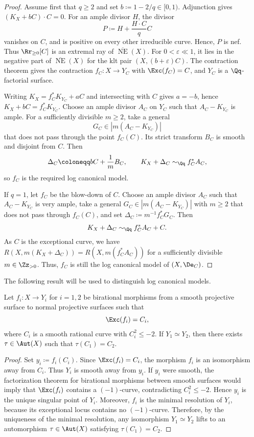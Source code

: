 \documentclass[12pt]{amsart}
\newcommand{\NE}{\overline{\operatorname{NE}}}
\begin{document}
\begin{proof}
Assume first that $q\geq2$ and set $b\coloneqq1-2/q\in[0,1)$. Adjunction gives $(K_X+bC)\cdot C=0$. For an ample divisor $H$, the divisor
\[
 P\coloneqq H+\frac{H\cdot C}{q}C
\]
vanishes on $C$, and is positive on every other irreducible curve. Hence, $P$ is nef. Thus $\Rr_{\geq0}[C]$ is an extremal ray of ${\NE}(X)$. For $0<\varepsilon\ll1$, it lies in the negative part of ${\NE}(X)$ for the klt pair $(X,(b+\varepsilon)C)$. The contraction theorem gives the contraction $f_C\colon X\to Y_C$ with $\Exc(f_C)=C$, and $Y_C$ is a $\Qq$-factorial surface. 

Writing $K_X=f_C^*K_{Y_C}+aC$ and intersecting with $C$ gives $a=-b$, hence $K_X+bC=f_C^*K_{Y_C}$. Choose an ample divisor $A_C$ on $Y_C$ such that $A_C-K_{Y_C}$ is ample. For a sufficiently divisible $m\geq2$, take a general
\[
 G_C\in|m(A_C-K_{Y_C})|
\]
that does not pass through the point $f_C(C)$. Its strict transform $B_C$ is smooth and disjoint from $C$. Then
\[
 \Delta_C\coloneqq bC+\frac1mB_C,
 \qquad K_X+\Delta_C\sim_{\Qq}f_C^*A_C,
\]
so $f_C$ is the required log canonical model.

If $q=1$, let $f_C$ be the blow-down of $C$. Choose an ample divisor $A_C$ such that $A_C-K_{Y_C}$ is very ample, take a general $G_C\in|m(A_C-K_{Y_C})|$ with $m\geq2$ that does not pass through $f_C(C)$, and set $\Delta_C\coloneqq m^{-1}f_C^*G_C$. Then
\[
 K_X+\Delta_C\sim_{\Qq}f_C^*A_C+C.
\]
As $C$ is the exceptional curve, we have $R(X, m(K_X+\Delta_C))=R(X, m(f_C^*A_C))$ for a sufficiently divisible $m \in \Zz_{>0}$. Thus, $f_C$ is still the log canonical model of $(X, \De_C)$.
\end{proof}

The following result will be used to distinguish log canonical models.

\begin{lemma}\label{lem:lifting-minimal-resolutions}
Let $f_i\colon X\to Y_i$ for $i=1,2$ be birational morphisms from a
smooth projective surface to normal projective surfaces such that
\[
\Exc(f_i)=C_i,
\]
where $C_i$ is a smooth rational curve with $C_i^2\leq-2$. If $Y_1\simeq Y_2$, then there exists $\tau \in \Aut(X)$ such that $\tau(C_1)=C_2$.
\end{lemma}

\begin{proof}
Set $y_i\coloneqq f_i(C_i)$. Since $\Exc(f_i)=C_i$, the morphism $f_i$
is an isomorphism away from $C_i$. Thus $Y_i$ is smooth away from
$y_i$. If $y_i$ were smooth, the factorization theorem for birational
morphisms between smooth surfaces would imply that $\Exc(f_i)$ contains
a $(-1)$-curve, contradicting $C_i^2\leq-2$. Hence $y_i$ is the unique
singular point of $Y_i$. Moreover, $f_i$ is the minimal resolution of
$Y_i$, because its exceptional locus contains no $(-1)$-curve.
Therefore, by the uniqueness of the minimal resolution, any isomorphism
$Y_1\simeq Y_2$ lifts to an automorphism $\tau\in\Aut(X)$ satisfying
$\tau(C_1)=C_2$.
\end{proof}
\end{document}
